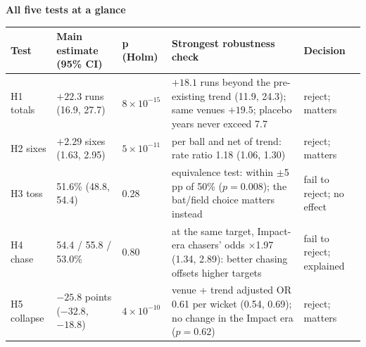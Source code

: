 \documentclass[10pt,a4paper]{article}
\begin{document}
\vspace{-2pt}
\noindent\begin{minipage}{\textwidth}
{\large\bfseries All five tests at a glance}\par\vspace{3pt}
{\small
\begin{tabularx}{\textwidth}{@{}P{1.9cm}P{3.6cm}P{1.6cm}LP{2.1cm}@{}}
\toprule
\textbf{Test} & \textbf{Main estimate (95\% CI)} & \textbf{p (Holm)} & \textbf{Strongest robustness check} & \textbf{Decision}\\
\midrule
H1 totals & $+22.3$ runs (16.9, 27.7) & $8 \times 10^{-15}$ & $+18.1$ runs beyond the pre-existing trend (11.9, 24.3); same venues $+19.5$; placebo years never exceed 7.7 & reject; matters\\
H2 sixes & $+2.29$ sixes (1.63, 2.95) & $5 \times 10^{-11}$ & per ball and net of trend: rate ratio 1.18 (1.06, 1.30) & reject; matters\\
H3 toss & 51.6\% (48.8, 54.4) & 0.28 & equivalence test: within $\pm$5 pp of 50\% ($p = 0.008$); the bat/field choice matters instead & fail to reject; no effect\\
H4 chase & 54.4 / 55.8 / 53.0\% & 0.80 & at the same target, Impact-era chasers' odds $\times$1.97 (1.34, 2.89): better chasing offsets higher targets & fail to reject; explained\\
H5 collapse & $-25.8$ points ($-32.8$, $-18.8$) & $4 \times 10^{-10}$ & venue + trend adjusted OR 0.61 per wicket (0.54, 0.69); no change in the Impact era ($p = 0.62$) & reject; matters\\
\bottomrule
\end{tabularx}}
\end{minipage}
\vspace{2pt}
\end{document}
